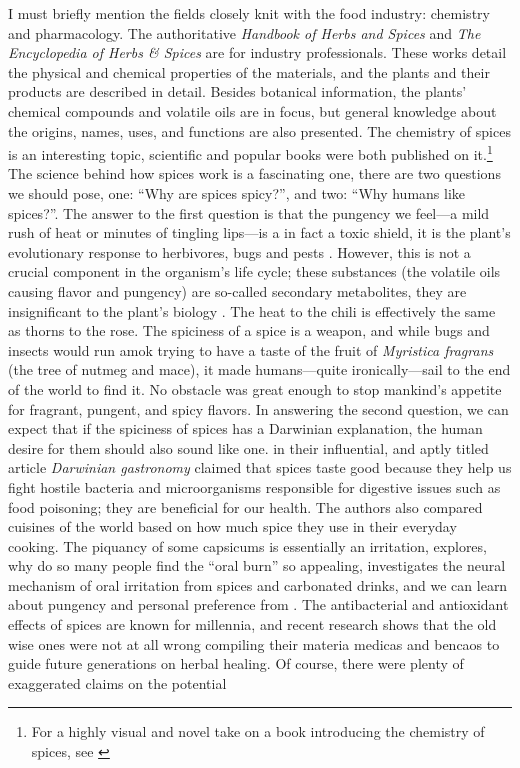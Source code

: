 I must briefly mention the fields closely knit with the food industry: chemistry and pharmacology. The authoritative \textit{Handbook of Herbs and Spices} \autocite{peter_handbook_2012} and \textit{The Encyclopedia of Herbs \& Spices} \autocite{ravindran_encyclopedia_2017} are for industry professionals. These works detail the physical and chemical properties of the materials, and the plants and their products are described in detail. Besides botanical information, the plants' chemical compounds and volatile oils are in focus, but general knowledge about the origins, names, uses, and functions are also presented. The chemistry of spices is an interesting topic, scientific and popular books were both published on it.\footnote{For a highly visual and novel take on a book introducing the chemistry of spices, see \textcite{farrimond_science_2018}} The science behind how spices work is a fascinating one, there are two questions we should pose, one: ``Why are spices spicy?'', and two: ``Why humans like spices?''. The answer to the first question is that the pungency we feel---a mild rush of heat or minutes of tingling lips---is a in fact a toxic shield, it is the plant's evolutionary response to herbivores, bugs and pests \autocite[21]{turner_spice_2004}. However, this is not a crucial component in the organism's life cycle; these substances (the volatile oils causing flavor and pungency) are so-called secondary metabolites, they are insignificant to the plant's biology \autocite[18]{parthasarathy_chemistry_2008}. The heat to the chili is effectively the same as thorns to the rose. The spiciness of a spice is a weapon, and while bugs and insects would run amok trying to have a taste of the fruit of \textit{Myristica fragrans} (the tree of nutmeg and mace), it made humans---quite ironically---sail to the end of the world to find it. No obstacle was great enough to stop mankind's appetite for fragrant, pungent, and spicy flavors. In answering the second question, we can expect that if the spiciness of spices has a Darwinian explanation, the human desire for them should also sound like one. \textcite{sherman_darwinian_1999} in their influential, and aptly titled article \textit{Darwinian gastronomy} claimed that spices taste good because they help us fight hostile bacteria and microorganisms responsible for digestive issues such as food poisoning; they are beneficial for our health. The authors also compared cuisines of the world based on how much spice they use in their everyday cooking. The piquancy of some capsicums is essentially an irritation, \textcite{spence_why_2018} explores, why do so many people find the ``oral burn'' so appealing, \textcite{carstens_it_2002} investigates the neural mechanism of oral irritation from spices and carbonated drinks, and we can learn about pungency and personal preference from \textcite{prescott_pungency_1995}. The antibacterial and antioxidant effects of spices are known for millennia, and recent research \autocite{billing_antimicrobial_1998,nilius_spices_2013,yashin_antioxidant_2017} shows that the old wise ones were not at all wrong compiling their \glspl{materia medica} and \glspl{bencao} to guide future generations on herbal healing. Of course, there were plenty of exaggerated claims on the potential 